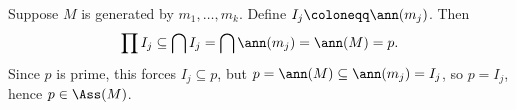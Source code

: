 Suppose $M$ is generated by $m_1, \ldots, m_k$. Define $I_j\coloneqq \ann(m_j)$.
Then \[ \prod I_j \subseteq \bigcap I_j = \bigcap \ann(m_j) = \ann(M) = p. \]
Since $p$ is prime, this forces $I_j \subseteq p$, but
$p = \ann(M) \subseteq \ann(m_j) = I_j$, so $p = I_j$, hence
$p \in \Ass(M)$.
